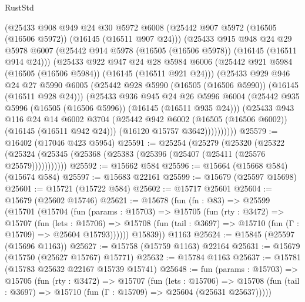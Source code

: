 \begin{lexlean}{RustStd}
\begin{coremodule}
          (@25433
            @908
            @949
            @24
            @30
            @5972
            @6008
            (@25442 @907 @5972 (@16505 (@16506 @5972)) (@16145 (@16511 @907 @24)))
            (@25433
              @915
              @948
              @24
              @29
              @5978
              @6007
              (@25442 @914 @5978 (@16505 (@16506 @5978)) (@16145 (@16511 @914 @24)))
              (@25433
                @922
                @947
                @24
                @28
                @5984
                @6006
                (@25442 @921 @5984 (@16505 (@16506 @5984)) (@16145 (@16511 @921 @24)))
                (@25433
                  @929
                  @946
                  @24
                  @27
                  @5990
                  @6005
                  (@25442 @928 @5990 (@16505 (@16506 @5990)) (@16145 (@16511 @928 @24)))
                  (@25433
                    @936
                    @945
                    @24
                    @26
                    @5996
                    @6004
                    (@25442 @935 @5996 (@16505 (@16506 @5996)) (@16145 (@16511 @935 @24)))
                    (@25433
                      @943
                      @116
                      @24
                      @14
                      @6002
                      @3704
                      (@25442 @942 @6002 (@16505 (@16506 @6002)) (@16145 (@16511 @942 @24)))
                      (@16120 @15757 @3642))))))))))
@25579 := @16402 (@17046 @423 @5954)
@25591 := @25254
    (@25279
      (@25320
        (@25322 (@25324 (@25345 (@25368 (@25383 (@25396 (@25407 (@25411 (@25576 @25579)))))))))))
@25592 := @15662 @584
@25596 := @15664 (@15668 @584) (@15674 @584)
@25597 := @15683 @22161
@25599 := @15679 (@25597 @15698)
@25601 := @15721 (@15722 @584)
@25602 := @15717 @25601
@25604 := @15679 (@25602 @15746)
@25621 := @15678
    (fun (fn : @83) =>
    @25599
      (@15701
        (@15704
          (fun (params : @15703) =>
          @15705
            (fun (rty : @3472) =>
            @15707
              (fun (lets : @15706) =>
              @15708 (fun (tail : @3697) => @15710 (fun (Γ : @15709) => @25604 @15793))))))
        @15839))
    @1163
@25624 := @15845 (@25597 (@15696 @1163))
@25627 := @15758 (@15759 @1163) @22164
@25631 := @15679 (@15750 (@25627 @15767) @15771)
@25632 := @15784 @1163
@25637 := @15781 (@15783 @25632 @22167 @15739 @15741)
@25648 := fun (params : @15703) =>
  @15705
    (fun (rty : @3472) =>
    @15707
      (fun (lets : @15706) =>
      @15708 (fun (tail : @3697) => @15710 (fun (Γ : @15709) => @25604 (@25631 @25637)))))

\end{coremodule}
\end{lexlean}
